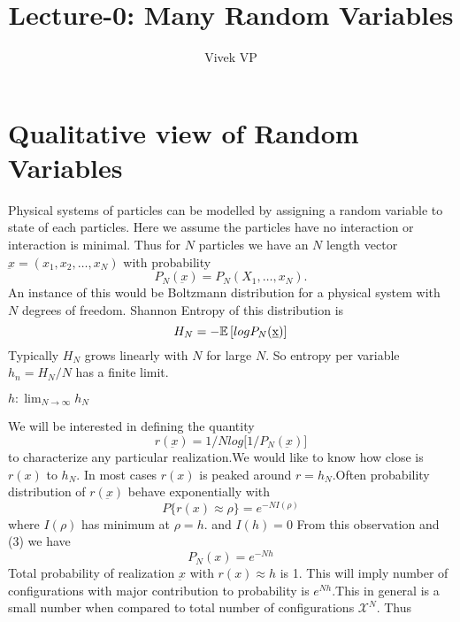 \documentclass[letterpaper,english,12pt]{article}
\title{Lecture-0: Many Random Variables}
\author{Vivek VP}
\begin{document}
\maketitle
\section{Qualitative view of Random Variables}
Physical systems of particles can be modelled by assigning a random variable to state of each particles. Here we assume the particles have no interaction or interaction is minimal. Thus for $N$ particles we have an $N$ length vector $\underbar x = (x_1,x_2,\dots ,x_N)$ with probability 
\begin{equation}
  P_N(\underbar x) = P_N(X_1,\dots ,x_N) .
\end{equation}
An instance of this would be Boltzmann distribution for a physical system with $N$ degrees of freedom. Shannon Entropy of this distribution is 
  \begin{equation}
      H_N = -\mathbb{E}\left[log P_N(\underbar x) \right]
  \end{equation}
  Typically $H_N$ grows linearly with $N$ for large $N$. So entropy per variable $h_n=H_N/N$ has a finite limit.
  \begin{defn}
  $h: \lim_{N\to\infty} h_N $
  \end{defn}
  We will be interested in defining the quantity 
  \begin{equation}
      r(\underbar x) = 1/N log \big[ 1/P_N(\underbar x)\big]
  \end{equation}
  to characterize any particular realization.We would like to know how close is $r(x)$ to $h_N$. In most cases $r(x)$ is peaked around $r=h_N$.Often probability distribution of $r(\underbar x)$ behave exponentially with 
  \begin{equation}
   P\lbrace r(x) \approx \rho \rbrace=e^{-NI(\rho)}
   \end{equation}
   where
   $I(\rho)$ has minimum at $\rho = h$.
   and $I(h)=0$
   From this observation and (3) we have 
   \begin{equation}
       P_N(x) = e^{-Nh}
   \end{equation}
   Total probability of realization $\underbar x$ with $r(x) \approx h$ is 1. This will imply number of configurations with major contribution to probability is $e^{Nh}. $This in general is a  small number when compared to total number of configurations $\mathcal{X}^N$. Thus 
\end{document}
